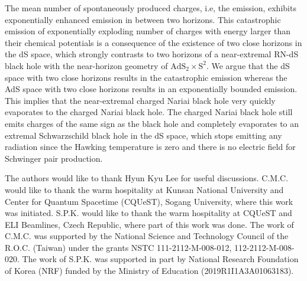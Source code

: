 \documentclass[aps,nofootinbib,superscriptaddress
]{revtex4}
\begin{document}
The mean number of spontaneously produced charges, i.e, the emission, exhibits exponentially enhanced emission in between two horizons. This catastrophic emission of exponentially exploding number of charges with energy larger than their chemical potentials is a consequence of the existence of two close horizons in the dS space, which strongly contrasts to two horizons of a near-extremal RN-dS black hole with the near-horizon geometry of $\mathrm{AdS}_2 \times \mathrm{S}^2$. We argue that the dS space with two close horizons results in the catastrophic emission whereas the AdS space with two close horizons results in an exponentially bounded emission. This implies that the near-extremal charged Nariai black hole very quickly evaporates to the charged Nariai black hole. The charged Nariai black hole still emits charges of the same sign as the black hole and completely evaporates to an extremal Schwarzschild black hole in the dS space, which stops emitting any radiation since the Hawking temperature is zero and there is no electric field for Schwinger pair production.


\acknowledgments
The authors would like to thank Hyun Kyu Lee for useful discussions.
C.M.C. would like to thank the warm hospitality at Kunsan National University and Center for Quantum Spacetime (CQUeST), Sogang University, where this work was initiated.
S.P.K. would like to thank the warm hospitality at CQUeST and ELI Beamlines, Czech Republic, where part of this work was done.
The work of C.M.C. was supported by the National Science and Technology Council of the R.O.C. (Taiwan) under the grants NSTC 111-2112-M-008-012, 112-2112-M-008-020.
The work of S.P.K. was supported in part by National Research Foundation of Korea (NRF) funded by the Ministry of Education (2019R1I1A3A01063183).
\end{document}
